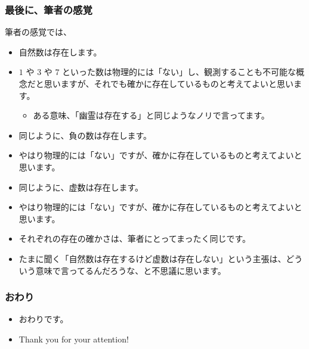 \documentclass[dvipdfmx]{beamer}
\begin{document}
  \begin{frame}
    \frametitle{最後に、筆者の感覚}

    筆者の感覚では、
    \begin{itemize}
      \item \alert{自然数は存在します}。
      \item $1$ や $3$ や $7$ といった数は物理的には「ない」し、観測することも不可能な概念だと思いますが、それでも確かに存在しているものと考えてよいと思います。
      \begin{itemize}
        \item ある意味、「幽霊は存在する」と同じようなノリで言ってます。
      \end{itemize}

      \pause

      \item 同じように、\alert{負の数は存在します}。
      \item やはり物理的には「ない」ですが、確かに存在しているものと考えてよいと思います。

      \pause

      \item 同じように、\alert{虚数は存在します}。
      \item やはり物理的には「ない」ですが、確かに存在しているものと考えてよいと思います。

      \pause

      \item それぞれの存在の確かさは、筆者にとってまったく同じです。
      \item たまに聞く「自然数は存在するけど虚数は存在しない」という主張は、どういう意味で言ってるんだろうな、と不思議に思います。
    \end{itemize}

  \end{frame}

  \begin{frame}
    \frametitle{おわり}

    \begin{itemize}
      \item おわりです。
      \item Thank you for your attention!
    \end{itemize}

  \end{frame}
\end{document}
